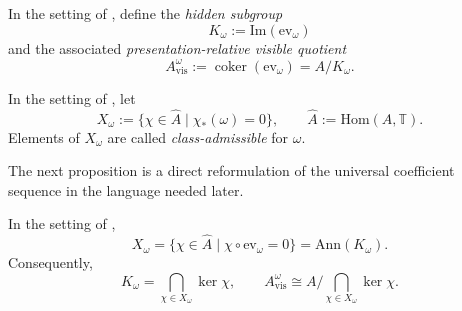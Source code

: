 \begin{definition}\label{def:intrinsic-visible-quotient}
In the setting of , define the \emph{hidden subgroup}
\[
K_{\omega}:=\mathrm{Im}(\mathrm{ev}_{\omega})
\]
and the associated \emph{presentation-relative visible quotient}
\[
A_{\mathrm{vis}}^{\omega}:=\operatorname{coker}(\mathrm{ev}_{\omega})=A/K_{\omega}.
\]
\end{definition}

\begin{definition}\label{def:class-admissible-character}
In the setting of , let
\[
X_{\omega}:=\{\chi\in\widehat A\mid \chi_*(\omega)=0\},
\qquad
\widehat A:=\mathrm{Hom}(A,\mathbb T).
\]
Elements of $X_{\omega}$ are called \emph{class-admissible} for $\omega$.
\end{definition}

The next proposition is a direct reformulation of the universal coefficient sequence in the language needed later.

\begin{proposition}\label{thm:intrinsic-visible-quotient}
In the setting of ,
\[
X_{\omega}
=
\{\chi\in\widehat A\mid \chi\circ \mathrm{ev}_{\omega}=0\}
=
\mathrm{Ann}(K_{\omega}).
\]
Consequently,
\[
K_{\omega}
=
\bigcap_{\chi\in X_{\omega}}\ker\chi,
\qquad
A_{\mathrm{vis}}^{\omega}\cong A\Big/\!\bigcap_{\chi\in X_{\omega}}\ker\chi.
\]
\end{proposition}

